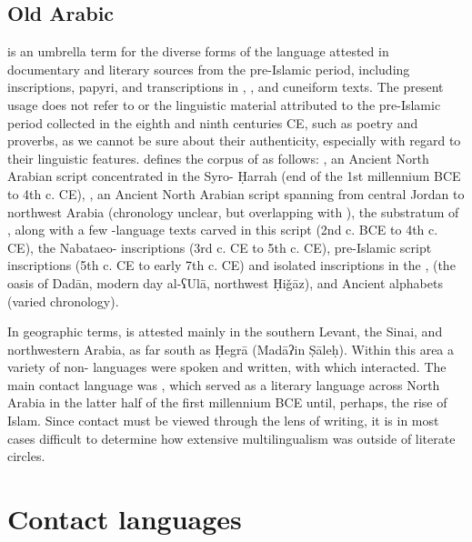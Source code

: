 \documentclass[output=paper]{langsci/langscibook}
\begin{document}
\subsection{Old Arabic}
  is an umbrella term for the diverse forms of the language attested in documentary and literary sources from the pre-Islamic period, including inscriptions, papyri, and transcriptions in , , and cuneiform texts. The present usage does not refer to   or the linguistic material attributed to the pre-Islamic period collected in the eighth and ninth centuries CE, such as poetry and proverbs, as we cannot be sure about their authenticity, especially with regard to their linguistic features. \citet{Al-Jallad2017early} defines the corpus of   as follows: , an Ancient North Arabian script concentrated in the Syro- Ḥarrah (end of the 1st millennium BCE to 4th c. CE), , an Ancient North Arabian script spanning from central Jordan to northwest Arabia (chronology unclear, but overlapping with ), the substratum of , along with a few -language texts carved in this script (2nd c. BCE to 4th c. CE), the Nabataeo- inscriptions (3rd c. CE to 5th c. CE), pre-Islamic  script inscriptions (5th c. CE to early 7th c. CE) and isolated inscriptions in the ,  (the oasis of Dadān, modern day al-ʕUlā, northwest Ḥiǧāz), and Ancient  alphabets (varied chronology). 

In geographic terms,   is attested mainly in the southern Levant, the Sinai, and northwestern Arabia, as far south as Ḥegrā (Madāʔin Ṣāleḥ). Within this area a variety of non- languages were spoken and written, with which   interacted. The main contact language was , which served as a literary language across North Arabia in the latter half of the first millennium BCE until, perhaps, the rise of Islam. Since contact must be viewed through the lens of writing, it is in most cases difficult to determine how extensive multilingualism was outside of literate circles.

\section{Contact languages}
\end{document}
